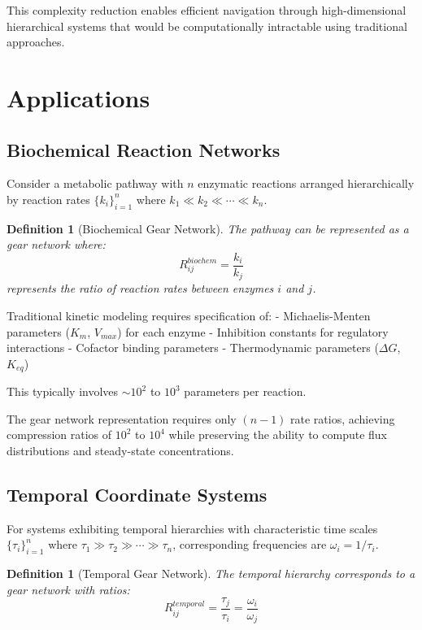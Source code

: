 \documentclass[11pt]{article}
\newtheorem{definition}[theorem]{Definition}
\theoremstyle{remark}
\begin{document}
This complexity reduction enables efficient navigation through high-dimensional hierarchical systems that would be computationally intractable using traditional approaches.

\section{Applications}

\subsection{Biochemical Reaction Networks}

Consider a metabolic pathway with $n$ enzymatic reactions arranged hierarchically by reaction rates $\{k_i\}_{i=1}^{n}$ where $k_1 \ll k_2 \ll \cdots \ll k_n$.

\begin{definition}[Biochemical Gear Network]
The pathway can be represented as a gear network where:
\begin{equation}
R_{ij}^{biochem} = \frac{k_i}{k_j}
\label{eq:biochemical_gear_ratio}
\end{equation}
represents the ratio of reaction rates between enzymes $i$ and $j$.
\end{definition}

Traditional kinetic modeling requires specification of:
- Michaelis-Menten parameters ($K_m$, $V_{max}$) for each enzyme
- Inhibition constants for regulatory interactions
- Cofactor binding parameters
- Thermodynamic parameters ($\Delta G$, $K_{eq}$)

This typically involves $\sim 10^2$ to $10^3$ parameters per reaction.

The gear network representation requires only $(n-1)$ rate ratios, achieving compression ratios of $10^2$ to $10^4$ while preserving the ability to compute flux distributions and steady-state concentrations.

\subsection{Temporal Coordinate Systems}

For systems exhibiting temporal hierarchies with characteristic time scales $\{\tau_i\}_{i=1}^{n}$ where $\tau_1 \gg \tau_2 \gg \cdots \gg \tau_n$, corresponding frequencies are $\omega_i = 1/\tau_i$.

\begin{definition}[Temporal Gear Network]
The temporal hierarchy corresponds to a gear network with ratios:
\begin{equation}
R_{ij}^{temporal} = \frac{\tau_j}{\tau_i} = \frac{\omega_i}{\omega_j}
\label{eq:temporal_gear_ratio}
\end{equation}
\end{definition}
\end{document}
